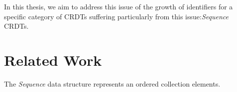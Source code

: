 \documentclass[sigplan]{acmart}
\begin{document}
In this thesis, we aim to address this issue of the growth of identifiers for a specific category of \acp{CRDT} suffering particularly from this issue:\emph{Sequence} \acp{CRDT}.

\section{Related Work}



The \emph{Sequence} data structure represents an ordered collection elements. %
\end{document}
